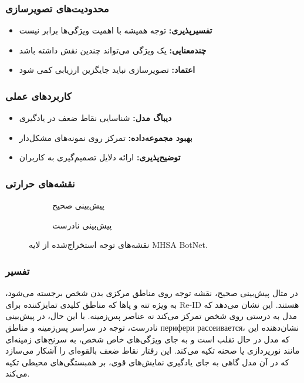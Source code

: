 \documentclass[12pt,a4paper]{article}
\theoremstyle{definition}
\begin{document}
\subsubsection*{محدودیت‌های تصویرسازی}
\begin{itemize}
    \item \textbf{تفسیرپذیری:} توجه همیشه با اهمیت ویژگی‌ها برابر نیست
    \item \textbf{چندمعنایی:} یک ویژگی می‌تواند چندین نقش داشته باشد
    \item \textbf{اعتماد:} تصویرسازی نباید جایگزین ارزیابی کمی شود
\end{itemize}

\subsubsection*{کاربردهای عملی}
\begin{itemize}
    \item \textbf{دیباگ مدل:} شناسایی نقاط ضعف در یادگیری
    \item \textbf{بهبود مجموعه‌داده:} تمرکز روی نمونه‌های مشکل‌دار
    \item \textbf{توضیح‌پذیری:} ارائه دلایل تصمیم‌گیری به کاربران
\end{itemize}

\subsubsection*{نقشه‌های حرارتی}
\begin{figure}[H]
    \centering
    \begin{subfigure}[b]{0.45\textwidth}
        \centering
        \caption{پیش‌بینی صحیح}
    \end{subfigure}
    \hfill
    \begin{subfigure}[b]{0.45\textwidth}
        \centering
        \caption{پیش‌بینی نادرست}
    \end{subfigure}
    \caption{نقشه‌های توجه استخراج‌شده از لایه MHSA BotNet.}
    \label{fig:attention_maps}
\end{figure}

\subsubsection*{تفسیر}
در مثال پیش‌بینی صحیح، نقشه توجه روی مناطق مرکزی بدن شخص برجسته می‌شود، به ویژه تنه و پاها که مناطق کلیدی تمایزکننده برای Re-ID هستند. این نشان می‌دهد که مدل به درستی روی شخص تمرکز می‌کند نه عناصر پس‌زمینه. با این حال، در پیش‌بینی نادرست، توجه در سراسر پس‌زمینه و مناطق перифери рассеивается، نشان‌دهنده این که مدل در حال تقلب است و به جای ویژگی‌های خاص شخص، به سرنخ‌های زمینه‌ای مانند نورپردازی یا صحنه تکیه می‌کند. این رفتار نقاط ضعف بالقوه‌ای را آشکار می‌سازد که در آن مدل گاهی به جای یادگیری نمایش‌های قوی، بر همبستگی‌های محیطی تکیه می‌کند.
\end{document}
